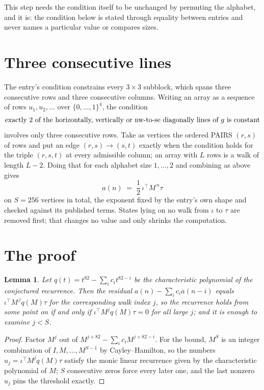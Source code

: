 \documentclass[11pt,a4paper]{article}
\theoremstyle{plain}
\newtheorem{lemma}[theorem]{Lemma}
\theoremstyle{definition}
\begin{document}
This step needs the condition itself to be unchanged by permuting the alphabet, and it is:
the condition below is stated through equality between entries and never names a particular
value or compares sizes.

\section{Three consecutive lines}

The entry's condition constrains every $3\times3$ subblock, which spans three consecutive
rows and three consecutive columns. Writing an array as a sequence of rows
$u_1,u_2,\dots$ over $\{0,\dots,1\}^{4}$, the condition
\[
\text{exactly }2\text{ of the horizontally, vertically or nw-to-se diagonally lines of }g\text{ \text{is constant}}
\]
involves only three consecutive rows. Take as vertices the ordered PAIRS $(r,s)$ of
rows and put an edge $(r,s)\to(s,t)$ exactly when the condition holds for the triple
$(r,s,t)$ at every admissible column; an array with $L$ rows is a walk of length $L-2$.
Doing that for each alphabet size $1,\dots,2$ and combining as above gives
\[
a(n)\;=\;\frac{1}{2}\,\iota^{\!\top}M^{\,n}\tau
\]
on $S=256$ vertices in total, the exponent fixed by the entry's own shape and checked against
its published terms. States lying on no walk from $\iota$ to $\tau$ are removed first; that
changes no value and only shrinks the computation.

\section{The proof}

\begin{lemma}\label{lem:crit}
Let $q(t)=t^{82}-\sum_i c_it^{82-i}$ be the characteristic polynomial of the
conjectured recurrence. Then the residual $a(n)-\sum_ic_ia(n-i)$ equals
$\iota^{\!\top}M^{\,j}q(M)\tau$ for the corresponding walk index $j$, so the
recurrence holds from some point on if and only if $\iota^{\!\top}M^{j}q(M)\tau=0$ for all
large $j$; and it is enough to examine $j<S$.
\end{lemma}

\begin{proof}
Factor $M^{j}$ out of $M^{j+82}-\sum_ic_iM^{j+82-i}$. For the bound, $M^{S}$
is an integer combination of $I,M,\dots,M^{S-1}$ by Cayley--Hamilton, so the numbers
$u_j=\iota^{\!\top}M^{j}q(M)\tau$ satisfy the monic linear recurrence given by the
characteristic polynomial of $M$; $S$ consecutive zeros force every later one, and the last
nonzero $u_j$ pins the threshold exactly.
\end{proof}
\end{document}
